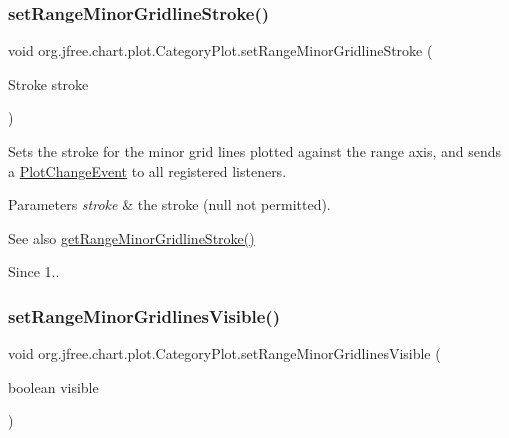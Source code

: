 \subsubsection{\texorpdfstring{set\+Range\+Minor\+Gridline\+Stroke()}{setRangeMinorGridlineStroke()}}
{\footnotesize\ttfamily void org.\+jfree.\+chart.\+plot.\+Category\+Plot.\+set\+Range\+Minor\+Gridline\+Stroke (\begin{DoxyParamCaption}\item[{Stroke}]{stroke }\end{DoxyParamCaption})}

Sets the stroke for the minor grid lines plotted against the range axis, and sends a \mbox{\hyperlink{}{Plot\+Change\+Event}} to all registered listeners.


\begin{DoxyParams}{Parameters}
{\em stroke} & the stroke ({\ttfamily null} not permitted).\\
\hline
\end{DoxyParams}
\begin{DoxySeeAlso}{See also}
\mbox{\hyperlink{classorg_1_1jfree_1_1chart_1_1plot_1_1_category_plot_aecf2eb95c22f637734856931ed842527}{get\+Range\+Minor\+Gridline\+Stroke()}}
\end{DoxySeeAlso}
\begin{DoxySince}{Since}
1.. 
\end{DoxySince}
\mbox{\label{classorg_1_1jfree_1_1chart_1_1plot_1_1_category_plot_ac8ee0242646ffadffb2cdfc8ac64a14a}} 
\subsubsection{\texorpdfstring{set\+Range\+Minor\+Gridlines\+Visible()}{setRangeMinorGridlinesVisible()}}
{\footnotesize\ttfamily void org.\+jfree.\+chart.\+plot.\+Category\+Plot.\+set\+Range\+Minor\+Gridlines\+Visible (\begin{DoxyParamCaption}\item[{boolean}]{visible }\end{DoxyParamCaption})}

